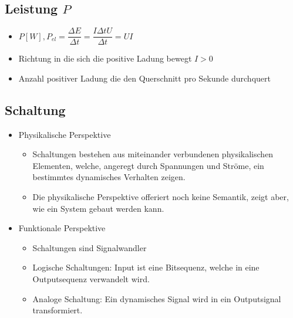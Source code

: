 \documentclass[8pt,a4paper]{scrartcl}
\begin{document}
\begin{multicols*}{3}
		\subsection{Leistung $P$}
			\begin{itemize}\itemsep0pt				
				\item $P [W], P_{el}=\dfrac{\Delta E}{\Delta t} = \dfrac{I \Delta t U}{\Delta t} = UI$
				\item Richtung in die sich die positive Ladung bewegt $I>0$
				\item Anzahl positiver Ladung die den Querschnitt pro Sekunde durchquert
			\end{itemize}
			
		\subsection{Schaltung}
			\begin{itemize}\itemsep0pt
				\item Physikalische Perspektive
				\begin{itemize}\itemsep0pt
					\item Schaltungen bestehen aus miteinander verbundenen physikalischen Elementen, welche, angeregt durch Spannungen und Ströme, ein bestimmtes dynamisches Verhalten zeigen.
					\item Die physikalische Perspektive offeriert noch keine Semantik, zeigt aber, wie ein System gebaut werden kann.
				\end{itemize}					
			
				\item Funktionale Perspektive
				\begin{itemize}\itemsep0pt
					\item Schaltungen sind Signalwandler
					\item Logische Schaltungen: Input ist eine Bitsequenz, welche in eine Outputsequenz verwandelt wird.
					\item Analoge Schaltung: Ein dynamisches Signal wird in ein Outputsignal transformiert.
				\end{itemize}						
			\end{itemize}		

\end{multicols*}
\end{document}
